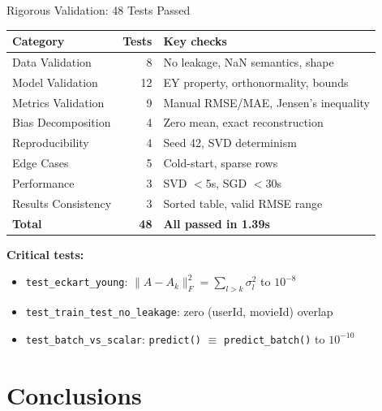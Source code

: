 \documentclass[10pt,t]{beamer}
\begin{document}
\begin{frame}{Rigorous Validation: 48 Tests Passed}
  \begin{center}
  \small
  \begin{tabular}{lrl}
    \toprule
    \textbf{Category} & \textbf{Tests} & \textbf{Key checks} \\
    \midrule
    Data Validation      &  8 & No leakage, NaN semantics, shape \\
    Model Validation     & 12 & EY property, orthonormality, bounds \\
    Metrics Validation   &  9 & Manual RMSE/MAE, Jensen's inequality \\
    Bias Decomposition   &  4 & Zero mean, exact reconstruction \\
    Reproducibility      &  4 & Seed 42, SVD determinism \\
    Edge Cases           &  5 & Cold-start, sparse rows \\
    Performance          &  3 & SVD $<$5s, SGD $<$30s \\
    Results Consistency  &  3 & Sorted table, valid RMSE range \\
    \midrule
    \textbf{Total} & \textbf{48} & \textbf{All passed in 1.39s} \\
    \bottomrule
  \end{tabular}
  \end{center}

  \textbf{Critical tests:}
  \begin{itemize}
    \item \texttt{test\_eckart\_young}: $\|A-A_k\|_F^2 = \sum_{l>k}\sigma_l^2$ to $10^{-8}$
    \item \texttt{test\_train\_test\_no\_leakage}: zero (userId, movieId) overlap
    \item \texttt{test\_batch\_vs\_scalar}: \texttt{predict()} $\equiv$ \texttt{predict\_batch()} to $10^{-10}$
  \end{itemize}
\end{frame}

\section{Conclusions}
\end{document}
